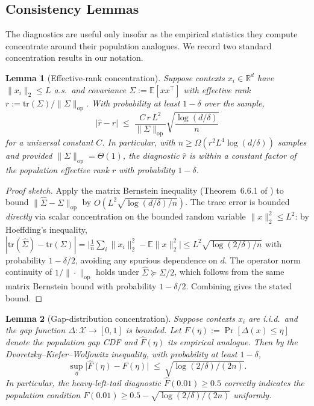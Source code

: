 \documentclass{article}
\newtheorem{lemma}{Lemma}
\theoremstyle{definition}
\theoremstyle{remark}
\theoremstyle{remark}
\begin{document}
\subsection{Consistency Lemmas}
\label{app:consistency}

The diagnostics are useful only insofar as the empirical statistics
they compute concentrate around their population analogues. We record
two standard concentration results in our notation.

\begin{lemma}[Effective-rank concentration]
\label{lem:eff-rank-concentration}
Suppose contexts $x_i\in\mathbb R^d$ have $\|x_i\|_2\le L$ a.s.\ and
covariance $\Sigma := \mathbb E[xx^\top]$ with effective rank
$r := \mathrm{tr}(\Sigma)/\|\Sigma\|_{\mathrm{op}}$. With probability
at least $1-\delta$ over the sample,
\[
\bigl|\widehat r - r\bigr|
\;\le\;
\frac{C\,r\,L^2}{\|\Sigma\|_{\mathrm{op}}}\sqrt{\frac{\log(d/\delta)}{n}}
\]
for a universal constant $C$. In particular, with $n\ge\Omega(r^2L^4\log(d/\delta))$
samples and provided $\|\Sigma\|_{\mathrm{op}}=\Theta(1)$, the diagnostic
$\widehat r$ is within a constant factor of the population effective
rank $r$ with probability $1-\delta$.
\end{lemma}

\begin{proof}[Proof sketch]
Apply the matrix Bernstein inequality
(Theorem~6.6.1 of \cite{lattimore2020bandit}) to bound
$\|\widehat\Sigma - \Sigma\|_{\mathrm{op}}$ by
$O(L^2\sqrt{\log(d/\delta)/n})$. The trace error is bounded
\emph{directly} via scalar concentration on the bounded random
variable $\|x\|_2^2\le L^2$: by Hoeffding's inequality,
$|\mathrm{tr}(\widehat\Sigma) - \mathrm{tr}(\Sigma)|
=\bigl|\tfrac1n\sum_i\|x_i\|_2^2-\mathbb E\|x\|_2^2\bigr|
\le L^2\sqrt{\log(2/\delta)/n}$ with probability $1-\delta/2$,
avoiding any spurious dependence on $d$. The operator norm
continuity of $1/\|\cdot\|_{\mathrm{op}}$ holds under
$\widehat\Sigma\succeq\Sigma/2$, which follows from the same matrix
Bernstein bound with probability $1-\delta/2$. Combining gives the
stated bound.
\end{proof}

\begin{lemma}[Gap-distribution concentration]
\label{lem:gap-concentration}
Suppose contexts $x_i$ are i.i.d.\ and the gap function
$\Delta:\mathcal X\to[0,1]$ is bounded. Let $F(\eta) := \Pr[\Delta(x)\le\eta]$
denote the population gap CDF and $\widehat F(\eta)$ its empirical
analogue. Then by the Dvoretzky--Kiefer--Wolfowitz inequality, with
probability at least $1-\delta$,
\[
\sup_\eta\bigl|\widehat F(\eta) - F(\eta)\bigr|
\;\le\;
\sqrt{\log(2/\delta)/(2n)}.
\]
In particular, the heavy-left-tail diagnostic
$\widehat F(0.01) \ge 0.5$ correctly indicates the population condition
$F(0.01) \ge 0.5 - \sqrt{\log(2/\delta)/(2n)}$ uniformly.
\end{lemma}
\end{document}
